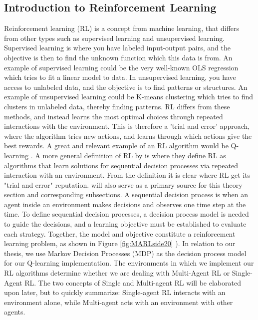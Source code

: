 \documentclass{article}
\begin{document}
\subsection{Introduction to Reinforcement Learning}
Reinforcement learning (RL) is a concept from machine learning, that differs from other types such as supervised learning and unsupervised learning.
Supervised learning is where you have labeled input-output pairs, and the objective is then to find the unknown function which this data is from. An example of supervised learning could be the very well-known OLS regression which tries to fit a linear model to data. In unsupervised learning, you have access to unlabeled data, and the objective is to find patterns or structures. An example of unsupervised learning could be K-means clustering which tries to find clusters in unlabeled data, thereby finding patterns. RL differs from these methods, and instead learns the most optimal choices through repeated interactions with the environment. This is therefore a 'trial and error' approach, where the algorithm tries new actions, and learns through which actions give the best rewards. A great and relevant example of an RL algorithm would be Q-learning \citep[p. 19-21]{marl-book}.
\newline 
\newline
A more general definition of RL by \cite[p. 20]{marl-book} is where they define RL as algorithms that learn solutions for sequential decision processes via repeated interaction with an environment.
From the definition it is clear where RL get its "trial and error" reputation. 
\cite{marl-book} will also serve as a primary source for this theory section and corresponding subsections.
\newline
A sequential decision process is when an agent inside an environment makes decisions and observes one time step at the time. To define sequential decision processes, a decision process model is needed to guide the decisions, and a learning objective must be established to evaluate each strategy. Together, the model and objective constitute a reinforcement learning problem, as shown in Figure \ref{fig:MARLside20} \citep[p. 20]{marl-book}). In relation to our thesis, we use Markov Decision Processes (MDP) as the decision process model for our Q-learning implementation.
\newline 
\newline
The environments in which we implement our RL algorithms determine whether we are dealing with Multi-Agent RL or Single-Agent RL. The two concepts of Single and Multi-agent RL will be elaborated upon later, but to quickly summarize: Single-agent RL interacts with an environment alone, while  Multi-agent acts with an environment with other agents\citep[p. 19-21]{marl-book}.
\end{document}

